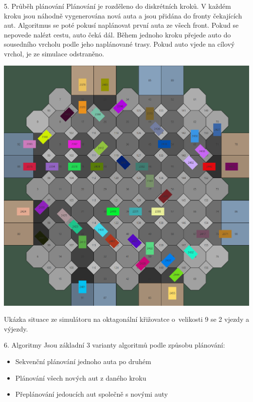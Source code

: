 \documentclass[portrait,fontscale=0.26,paperwidth=842mm,paperheight=1185mm]{baposter}
\begin{document}
\begin{poster}
		\begin{posterbox}[column=1, name=planovani]{5. Průběh plánování}
			Plánování je rozděleno do diskrétních kroků.
			V každém kroku jsou náhodně vygenerována nová auta a jsou přidána do fronty čekajících aut.
			Algoritmus se poté pokusí naplánovat první auta ze všech front.
			Pokud se nepovede nalézt cestu, auto čeká dál.
			Během jednoho kroku přejede auto do sousedního vrcholu podle jeho naplánované trasy.
			Pokud auto vjede na cílový vrchol, je ze simulace odstraněno.
		\end{posterbox}


		\begin{posterbox}[column=1, name=ukazka, below=planovani]{}
			\begin{center}
				\includegraphics[width=0.79\linewidth]{img/simulator1}

				Ukázka situace ze simulátoru na oktagonální křižovatce o~velikosti 9 se 2 vjezdy a výjezdy.
			\end{center}
		\end{posterbox}

		\begin{posterbox}[column=1, name=algoritmy, below=ukazka]{6. Algoritmy}
			Jsou základní 3 varianty algoritmů podle způsobu plánování:
			\begin{itemize}
				\item Sekvenční plánování jednoho auta po druhém
				\item Plánování všech nových aut z daného kroku
				\item Přeplánování jedoucích aut společně s novými auty
			\end{itemize}


\end{posterbox}
\end{poster}
\end{document}
